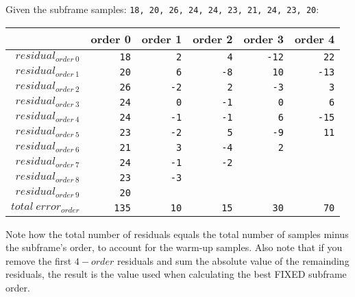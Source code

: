 Given the subframe samples: \texttt{18, 20, 26, 24, 24, 23, 21, 24, 23, 20}:
\begin{table}[h]
\begin{tabular}{r|r|r|r|r|r}
& order 0 & order 1 & order 2 & order 3 & order 4 \\
\hline
$residual_{order~0}$ & \texttt{\color{gray}18} & \texttt{\color{gray}2} & \texttt{\color{gray}4} & \texttt{\color{gray}-12} & \texttt{22} \\
$residual_{order~1}$ & \texttt{\color{gray}20} & \texttt{\color{gray}6} & \texttt{\color{gray}-8} & \texttt{10} & \texttt{-13} \\
$residual_{order~2}$ & \texttt{\color{gray}26} & \texttt{\color{gray}-2} & \texttt{2} & \texttt{-3} & \texttt{3} \\
$residual_{order~3}$ & \texttt{\color{gray}24} & \texttt{0} & \texttt{-1} & \texttt{0} & \texttt{6} \\
$residual_{order~4}$ & \texttt{24} & \texttt{-1} & \texttt{-1} & \texttt{6} & \texttt{-15} \\
$residual_{order~5}$ & \texttt{23} & \texttt{-2} & \texttt{5} & \texttt{-9} & \texttt{11} \\
$residual_{order~6}$ & \texttt{21} & \texttt{3} & \texttt{-4} & \texttt{2} \\
$residual_{order~7}$ & \texttt{24} & \texttt{-1} & \texttt{-2} \\
$residual_{order~8}$ & \texttt{23} & \texttt{-3} \\
$residual_{order~9}$ & \texttt{20} \\
\hline
$total~error_{order}$ & \texttt{135} & \texttt{10} & \texttt{15} & \texttt{30} & \texttt{70} \\
\end{tabular}
\end{table}
\par
\noindent
Note how the total number of residuals equals the
total number of samples minus the subframe's order,
to account for the warm-up samples.
Also note that if you remove the first $4 - order$ residuals
and sum the absolute value of the remainding residuals,
the result is the  value
used when calculating the best FIXED subframe order.

\clearpage

